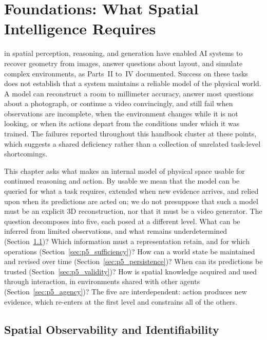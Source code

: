 \chapter{Foundations: What Spatial Intelligence Requires}
\label{chapter:p5_discussions}




 in spatial perception, reasoning, and generation have enabled AI systems to recover geometry from images, answer questions about layout, and simulate complex environments, as Parts~II to~IV documented.
Success on these tasks does not establish that a system maintains a reliable model of the physical world.
A model can reconstruct a room to millimeter accuracy, answer most questions about a photograph, or continue a video convincingly, and still fail when observations are incomplete, when the environment changes while it is not looking, or when its actions depart from the conditions under which it was trained.
The failures reported throughout this handbook cluster at these points, which suggests a shared deficiency rather than a collection of unrelated task-level shortcomings.

This chapter asks what makes an internal model of physical space usable for continued reasoning and action.
By usable we mean that the model can be queried for what a task requires, extended when new evidence arrives, and relied upon when its predictions are acted on; we do not presuppose that such a model must be an explicit 3D reconstruction, nor that it must be a video generator.
The question decomposes into five, each posed at a different level.
What can be inferred from limited observations, and what remains underdetermined (Section~\ref{sec:p5_observability})?
Which information must a representation retain, and for which operations (Section~\ref{sec:p5_sufficiency})?
How can a world state be maintained and revised over time (Section~\ref{sec:p5_persistence})?
When can its predictions be trusted (Section~\ref{sec:p5_validity})?
How is spatial knowledge acquired and used through interaction, in environments shared with other agents (Section~\ref{sec:p5_agency})?
The five are interdependent: action produces new evidence, which re-enters at the first level and constrains all of the others.


\section{Spatial Observability and Identifiability}
\label{sec:p5_observability}

